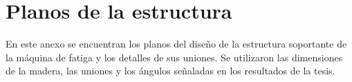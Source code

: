 %
\chapter{Planos de la estructura}
\label{sec:planos}

En este anexo se encuentran los planos del diseño de la estructura soportante de la máquina de fatiga y los detalles de sus uniones. Se utilizaron las dimensiones de la madera, las uniones y los ángulos señaladas en los resultados de la tesis. 

